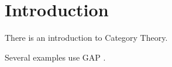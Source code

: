 \chapter*{Introduction}

There is an introduction to Category Theory. 


Several examples use GAP \cite{url:gap}.
